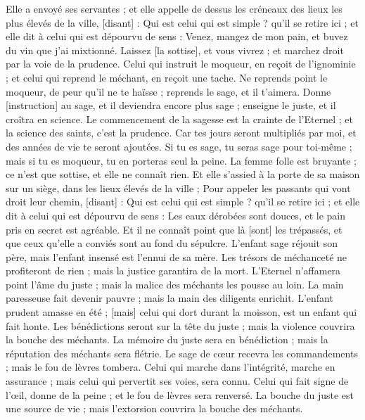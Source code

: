 \begin{multicols}{2}
Elle a envoyé ses servantes ; et elle appelle de dessus les créneaux des lieux les plus élevés de la ville, [disant] :
Qui est celui qui est simple ? qu'il se retire ici ; et elle dit à celui qui est dépourvu de sens :
Venez, mangez de mon pain, et buvez du vin que j'ai mixtionné.
Laissez [la sottise], et vous vivrez ; et marchez droit par la voie de la prudence.
Celui qui instruit le moqueur, en reçoit de l'ignominie ; et celui qui reprend le méchant, en reçoit une tache.
Ne reprends point le moqueur, de peur qu'il ne te haïsse ; reprends le sage, et il t'aimera.
Donne [instruction] au sage, et il deviendra encore plus sage ; enseigne le juste, et il croîtra en science.
Le commencement de la sagesse est la crainte de l'Eternel ; et la science des saints, c'est la prudence.
Car tes jours seront multipliés par moi, et des années de vie te seront ajoutées.
Si tu es sage, tu seras sage pour toi-même ; mais si tu es moqueur, tu en porteras seul la peine.
La femme folle est bruyante ; ce n'est que sottise, et elle ne connaît rien.
Et elle s'assied à la porte de sa maison sur un siège, dans les lieux élevés de la ville ;
Pour appeler les passants qui vont droit leur chemin, [disant] :
Qui est celui qui est simple ? qu'il se retire ici ; et elle dit à celui qui est dépourvu de sens :
Les eaux dérobées sont douces, et le pain pris en secret est agréable.
Et il ne connaît point que là [sont] les trépassés, et que ceux qu'elle a conviés sont au fond du sépulcre.
\VerseOne{}L'enfant sage réjouit son père, mais l'enfant insensé est l'ennui de sa mère.
Les trésors de méchanceté ne profiteront de rien ; mais la justice garantira de la mort.
L'Eternel n'affamera point l'âme du juste ; mais la malice des méchants les pousse au loin.
La main paresseuse fait devenir pauvre ; mais la main des diligents enrichit.
L'enfant prudent amasse en été ; [mais] celui qui dort durant la moisson, est un enfant qui fait honte.
Les bénédictions seront sur la tête du juste ; mais la violence couvrira la bouche des méchants.
La mémoire du juste sera en bénédiction ; mais la réputation des méchants sera flétrie.
Le sage de cœur recevra les commandements ; mais le fou de lèvres tombera.
Celui qui marche dans l'intégrité, marche en assurance ; mais celui qui pervertit ses voies, sera connu.
Celui qui fait signe de l'œil, donne de la peine ; et le fou de lèvres sera renversé.
La bouche du juste est une source de vie ; mais l'extorsion couvrira la bouche des méchants.

\end{multicols}
